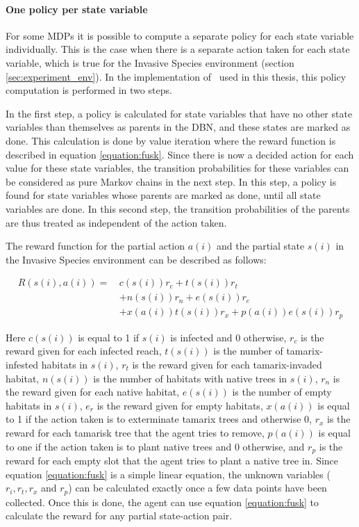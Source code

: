 \paragraph{One policy per state variable}
\label{sec:one_policy_per_state_variable}

For some MDPs it is possible to compute a separate policy for each state
variable individually. This is the case when there is a separate action taken
for each state variable, which is true for the Invasive Species environment
(section \ref{sec:experiment_env}). In the implementation of \etre\ used in
this thesis, this policy computation is performed in two steps. 

In the first step, a policy is calculated for state variables that have no
other state variables than themselves as parents in the DBN, and these states
are marked as done. This calculation is done by value iteration where the reward function
is described in equation \eqref{equation:fusk}. Since there is now a decided action for each value for
these state variables, the transition probabilities for these variables can be
considered as pure Markov chains in the next step. In this step, a policy is
found for state variables whose parents are marked as done, until all state
variables are done. In this second step, the transition probabilities of the
parents are thus treated as independent of the action taken.

The reward function for the partial action $a(i)$ and the partial state $s(i)$ in the Invasive Species environment can be described as follows:

\begin{align}
\label{equation:fusk}
R(s(i),a(i)) = \, 
 & c(s(i)) r_c + t(s(i)) r_t  \nonumber \\
 & + n(s(i)) r_n + e(s(i)) r_e   \nonumber \\
 & +  x(a(i)) t(s(i)) r_x + p(a(i)) e(s(i)) r_p
\end{align}

Here $c(s(i))$ is equal to 1 if $s(i)$ is infected and 0 otherwise, $r_c$ is the reward given for each infected reach, $t(s(i))$ is the number of tamarix-infested habitats in $s(i)$, $r_t$ is the reward given for each tamarix-invaded habitat, $n(s(i))$ is the number of habitats with native trees in $s(i)$, $r_n$ is the reward given for each native habitat, $e(s(i))$ is the number of empty habitats in $s(i)$, $e_r$ is the reward given for empty habitats, $x(a(i))$ is equal to 1 if the action taken is to exterminate tamarix trees and otherwise 0, $r_x$ is the reward for each tamarisk tree that the agent tries to remove, $p(a(i))$ is equal to one if the action taken is to plant native trees and 0 otherwise, and $r_p$ is the reward for each empty slot that the agent tries to plant a native tree in. 
Since equation \eqref{equation:fusk} is a simple linear equation, the unknown variables ($r_i, r_t, r_x$ and $r_p$) can be calculated exactly once a few data points have been collected. Once this is done, the agent can use equation \eqref{equation:fusk} to calculate the reward for any partial state-action pair. 

